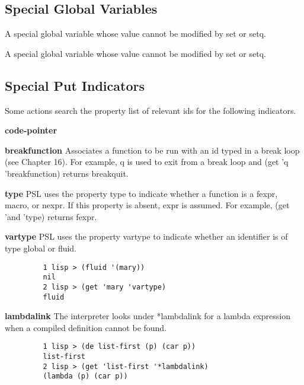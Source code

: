 \subsection{Special Global Variables}

{
    A  special global variable whose value cannot be modified by
    set or setq.
}

{
    A special global variable whose value cannot be modified  by
    set or setq.
}

\subsection{Special Put Indicators}

  Some  actions search the property list of relevant ids for the
following indicators.

\begin{Ventry}{\bf code-pointer}
\item [{\bf breakfunction}] Associates a function to be 
              run with an  id typed
              in  a break loop (see Chapter 16).  For example, q
              is used to exit from a  break  loop  and  (get 'q
              'breakfunction) returns breakquit.

\item [{\bf type}] PSL  uses  the property type to indicate whether
														a function is a fexpr, macro, or  nexpr.    If  this
              property  is absent, expr is assumed. For example,
              (get 'and 'type) returns fexpr.

\item [{\bf vartype}] PSL uses the property vartype to indicate 
whether
              an identifier is of type global or fluid.
\begin {verbatim}
         1 lisp > (fluid '(mary))
         nil
         2 lisp > (get 'mary 'vartype)
         fluid 
\end{verbatim}

\item[{\bf *lambdalink}]   The  interpreter  looks  under  *lambdalink  for a
              lambda  expression  when  a  compiled   definition
              cannot be found.
\begin {verbatim}
         1 lisp > (de list-first (p) (car p))
         list-first
         2 lisp > (get 'list-first '*lambdalink)
         (lambda (p) (car p))
\end{verbatim}
\end{Ventry}

